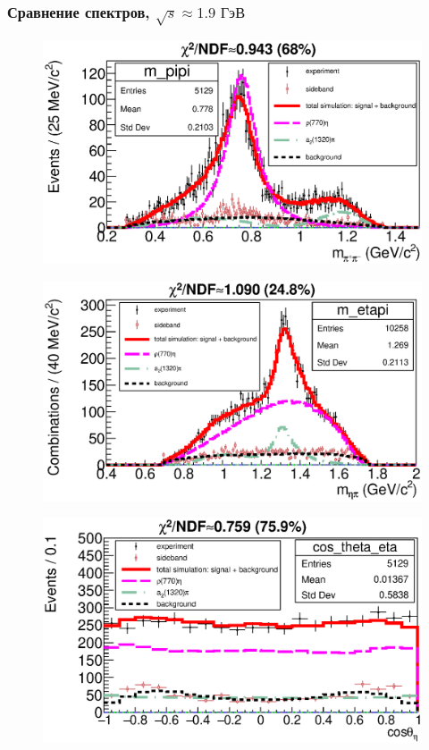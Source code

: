 \documentclass{beamer}
\begin{document}
\begin{frame}
  \frametitle{Сравнение спектров, $\sqrt{s}\approx{1.9}\text{ ГэВ}$}
  \begin{minipage}[t]{0.48\linewidth}
    \begin{figure}
      \includegraphics[width=\linewidth]{figures/m_pipi_g950.eps}
    \end{figure}
  \end{minipage}
  \begin{minipage}[t]{0.48\linewidth}
    \begin{figure}
      \includegraphics[width=\linewidth]{figures/m_etapi_g950.eps}
    \end{figure}
  \end{minipage}
  \begin{minipage}[t]{0.48\linewidth}
    \begin{figure}
      \includegraphics[width=\linewidth]{figures/cos_theta_eta_g950.eps}

\end{figure}
\end{minipage}
\end{frame}
\end{document}
